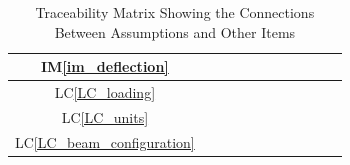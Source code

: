 \documentclass[12pt]{article}
\newcommand{\iref}[1]{IM\ref{#1}}
\newcommand{\lcref}[1]{LC\ref{#1}}
\begin{document}
{\begin{landscape}
\begin{table}[h!]
\begin{tabular}{|c|c|c|c|c|c|c|c|c|c|c|}
                \iref{im_deflection}          &                        &                     &                                   &                            &                                     &                              &                              &                        &                                  &                           \\ \hline
                \lcref{LC_loading}            &                        &                     &                                   &                            &                                     &                              &                              &                        &                                  &                           \\ \hline
                \lcref{LC_units}              &                        &                     &                                   &                            &                                     &                              &                              &                        &                                  &                           \\ \hline
                \lcref{LC_beam_configuration} &                        &                     &                                   &                            &                                     &                              &                              &                        &                                  &                           \\ \hline
            \end{tabular}
            \caption{Traceability Matrix Showing the Connections Between Assumptions and Other Items}
            \label{Table:A_trace}
        \end{table}
    \end{landscape}
}
\end{document}
